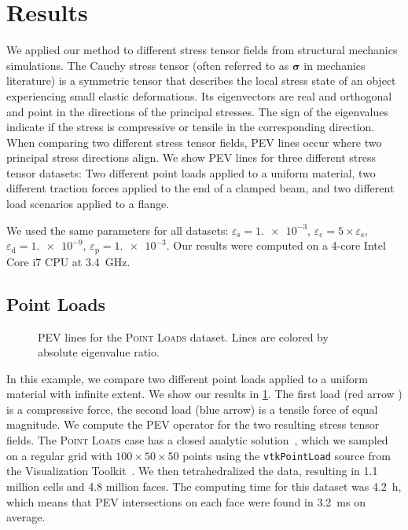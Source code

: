 \section{Results} %
\label{sec:pev_results}
%
We applied our method to different stress tensor fields from structural
mechanics simulations.
%
The Cauchy stress tensor (often referred to as $\mathbf{\sigma}$ in mechanics
literature) is a symmetric tensor that describes the local stress state of an
object experiencing small elastic deformations.
%
Its eigenvectors are real and orthogonal and point in the directions of the
principal stresses.
%
The sign of the eigenvalues indicate if the stress is compressive or tensile in
the corresponding direction.
%
When comparing two different stress tensor fields, \ac{PEV} lines occur where
two principal stress directions align.
%
We show \ac{PEV} lines for three different stress tensor datasets:
%
Two different point loads applied to a uniform material, two different traction
forces applied to the end of a clamped beam, and two different load scenarios
applied to a flange.
%

%
We used the same parameters for all datasets:
%
$\varepsilon_\mathrm{s} = \num{1.e-3}$, $\varepsilon_\mathrm{c} = 5 \times
\varepsilon_\mathrm{s}$, $\varepsilon_\mathrm{d} = \num{1.e-9}$,
$\varepsilon_\mathrm{p} = \num{1.e-3}$.
%
Our results were computed on a 4-core Intel Core i7 \ac{CPU} at
\SI{3.4}{\giga\hertz}.
%
\subsection{Point Loads} %
\label{ssub:point_loads}
%
\begin{figure}[t]
    \setlength\figurewidth\textwidth
    \centering
    
    \caption{\ac{PEV} lines for the \textsc{Point Loads} dataset. Lines are
             colored by absolute eigenvalue ratio.}
    \label{fig:point_load}
\end{figure}
%
In this example, we compare two different point loads applied to a uniform
material with infinite extent.
%
We show our results in \cref{fig:point_load}.
%
The first load (red arrow ) is a compressive force, the second load (blue arrow)
is a tensile force of equal magnitude.
%
We compute the \ac{PEV} operator for the two resulting stress tensor fields.
%
The \textsc{Point Loads} case has a closed analytic solution~\cite{Saada2013},
which we sampled on a regular grid with $\num{100} \times \num{50} \times
\num{50}$ points using the \texttt{vtkPointLoad} source from the Visualization
Toolkit~\cite{Schroeder2006}.
%
We then tetrahedralized the data, resulting in \num{1.1} million cells and
\num{4.8} million faces.
%
The computing time for this dataset was \SI{4.2}{\hour}, which means that
\ac{PEV} intersections on each face were found in \SI{3.2}{\milli\second} on
average.
%

